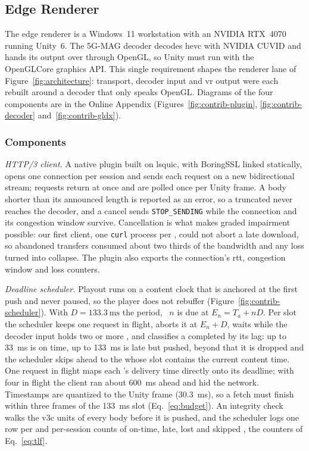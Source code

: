 \subsection{Edge Renderer}
\label{sec:sys-edge}

The edge renderer is a Windows~11 workstation with an NVIDIA RTX~4070
running Unity~6. The 5G-MAG decoder decodes \gls{hevc} with NVIDIA
CUVID and hands its output over through OpenGL, so Unity must run with
the OpenGLCore graphics API. This single requirement shapes the
renderer lane of Figure~\ref{fig:architecture}: transport, decoder
input and \gls{vr} output were each rebuilt around a decoder that only
speaks OpenGL. Diagrams of the four components are in the Online
Appendix\ifappendix{} (Figures~\ref{fig:contrib-plugin},
\ref{fig:contrib-decoder} and~\ref{fig:contrib-gldx})\fi.

\subsubsection{Components}
\label{sec:sys-client}
\label{sec:sys-scheduler}
\label{sec:sys-decoder}
\label{sec:sys-gldx}
\emph{HTTP/3 client.} A native plugin built on lsquic, with BoringSSL
linked statically, opens one \quic connection per session and sends
each \gof request on a new bidirectional stream; requests return at
once and are polled once per Unity frame. A body shorter than its
announced length is reported as an error, so a truncated \gof never
reaches the decoder, and a cancel sends \texttt{STOP\_SENDING} while
the connection and its congestion window survive. Cancellation is what
makes graded impairment possible: our first client, one \texttt{curl}
process per \gof, could not abort a late download, so abandoned
transfers consumed about two thirds of the bandwidth and any loss
turned into collapse. The plugin also exports the connection's
\gls{rtt}, congestion window and loss counters.

\emph{Deadline scheduler.} Playout runs on a content clock that is
anchored at the first push and never paused, so the player does not
rebuffer (Figure~\ref{fig:contrib-scheduler}). With
$D = \SI{133.3}{\milli\second}$ the \gof period, \gof~$n$ is due at
$E_n = T_a + nD$. Per slot the scheduler keeps one request in flight,
aborts it at $E_n + D$, waits while the decoder input holds two or more
\gofs, and classifies a completed \gof by its lag: up to
\SI{33}{\milli\second} is on time, up to \SI{133}{\milli\second} is late
but pushed, beyond that it is dropped and the scheduler skips ahead to
the \gof whose slot contains the current content time. One request in
flight maps each \gof's delivery time directly onto its deadline; with
four in flight the client ran about \SI{600}{\milli\second} ahead and
hid the network. Timestamps are quantized to the Unity frame
(\SI{30.3}{\milli\second}), so a fetch must finish within three frames
of the \SI{133}{\milli\second} slot (Eq.~\eqref{eq:budget}). An
integrity check walks the \gls{v3c} units of every body before it is
pushed, and the scheduler logs one row per \gof and per-session counts
of on-time, late, lost and skipped \gofs, the counters of
Eq.~\eqref{eq:tlf}.

